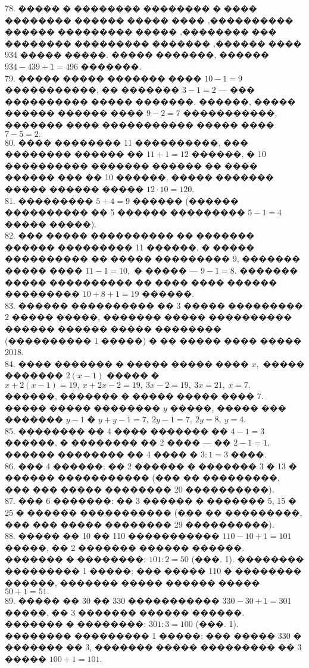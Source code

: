 \documentclass[12pt]{article}
\begin{document}
78. ׸���� � �������� �������� � ����� ����������, ���� ����� ������ �������� ��� ��������, ����� ��������� ������ ���� ������, ������� ��������� �������� ����� ����� 934. ����� �������, ������ $934-439+1=496$ �������.\\
79. ����� ����� ������� ���� $10-1=9$ �����������, �� ������� $3-1=2$ --- ��� ���������� ����� �������. ������, ����� ������ ������ ���� $9-2=7$ �����������, ������� ���� ����������� ����� ���� $7-5=2.$\\
80. ���� �������� 11 ����������, ��� �������� ������ �� $11+1=12$ ������, � 10 ���������� ������� ������ �� ���� ������ ��� �� 10 ������, ����� ������� ����� ������ ����� $12\cdot10=120.$\\
81. ��������� $5+4=9$ ������ (������ ���������� �� 5 ������ ��������� $5-1=4$ ����� �����).\\
82. ��� ����� ���������� �� ������� ������ ��������� 11 ������, � ����� ���������� �� ����� ��������� 9, ������� ����� ���� $11-1=10,$ � ����� --- $9-1=8.$ ������� ����� ���������� �� ���� ���� ������ ��������� $10+8+1=19$ ������.\\
83. ������ ���������� �� 3 ����� ��������� 2 ����� �����, ������� ����� ���������� ������ ������ ����� �������� (���������� 1 �����) � �� ����� ���� ����� 2018.\\
84. ���� ������� � ����� ����� ���� $x,$ ����� ������� $2(x-1)$ ����� � $x+2(x-1)=19,\ x+2x-2=19,\ 3x-2=19,\ 3x=21,\ x=7.$ ������, ������� � ����� ����� ���� 7. ����� ����� �������� $y$ �����, ����� ��� ������� $y-1$ � $y+y-1=7,\ 2y-1=7,\ 2y=8,\ y=4.$\\
85. �������� �� 4 ���� ������� �� $4-1=3$ ������, � �������� �� 2 ���� --- �� $2-1=1,$ ������ �������� �� 4 ���� � $3:1=3$ ����.\\
86. ��� 4 ������: �� 2 ������ � ������� 3 � 13 � ������ ����������� (��� �� ���������, ��� ��� ����� �������� 20 ����������).\\
87. ��� 6 �������: �� 3 ������ � ������� 5, 15 � 25 � ������ ����������� (��� �� ���������, ��� ��� ����� �������� 29 ����������).\\
88. ����� �� 10 �� 110 ����������� $110-10+1=101$ �����, �� 2 ������� ������ ������. ������� � ��������: $101:2=50$ (���. 1). �������� ��������� 1 �����: ��� ����� 110 � �������� ������, ������� ����� ������ ����� $50+1=51.$\\
89. ����� �� 30 �� 330 ����������� $330-30+1=301$ �����, �� 3 ������� ������ ������. ������� � ��������: $301:3=100$ (���. 1). �������� ��������� 1 �����: ��� ����� 330 � ������� �� 3, ������� ����� ��������� �� 3 ����� $100+1=101.$\\
\end{document}
